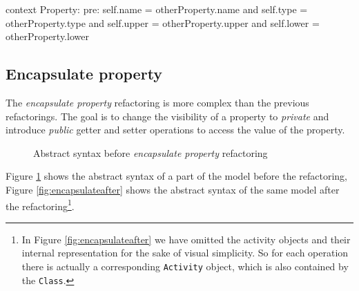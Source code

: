 \documentclass{llncs}
\begin{document}
\begin{lstsingle}[language=OCL, caption={OCL for additional properties}, label=lst:additionalproperties]
context Property:
pre: self.name = otherProperty.name
     and self.type = otherProperty.type
     and self.upper = otherProperty.upper
     and self.lower = otherProperty.lower
\end{lstsingle}

\subsection{Encapsulate property}
\label{sec:encapsulate}
The \textit{encapsulate property} refactoring is more complex than the previous refactorings. The goal is to change the visibility of a 
property to \textit{private} and introduce \textit{public} getter and setter operations to access the value of the property. 

\begin{figure}
 \caption{Abstract syntax before \textit{encapsulate property} refactoring}
 \label{fig:encapsulatebefore}
\end{figure}

Figure \ref{fig:encapsulatebefore} shows the abstract syntax of a part of the model before the refactoring, 
Figure \ref{fig:encapsulateafter} shows the abstract syntax of the same model after the refactoring\footnote{
In Figure \ref{fig:encapsulateafter} 
we have omitted the activity objects and their internal representation for the sake of visual simplicity. So for each operation 
there is actually a corresponding \texttt{Activity} object, which is also contained by the \texttt{Class}.}.
\end{document}
